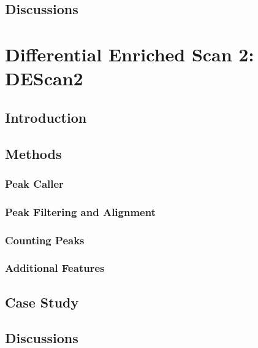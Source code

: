 \documentclass[b5paper, oneside, british, intoc, bibliograph=totoc, index=totoc, BCOR10mm, twoside, openright]{book}
\numberwithin{equation}{section}
\numberwithin{figure}{section}
\begin{document}
\section{Discussions} \label{sec:ticorseconclusions}



\chapter{Differential Enriched Scan 2: DEScan2} \label{sec:descan2cap}

\section{Introduction} \label{sec:descan2intro}

\section{Methods} \label{sec:descan2methods}

\subsection{Peak Caller} \label{sec:descan2peakcall}

\subsection{Peak Filtering and Alignment} \label{sec:descan2filtering}

\subsection{Counting Peaks} \label{sec:descan2peakcounts}

\subsection{Additional Features} \label{sec:descan2addfeat}

\section{Case Study} \label{sec:descan2results}

\section{Discussions} \label{sec:descan2next}

\end{document}
